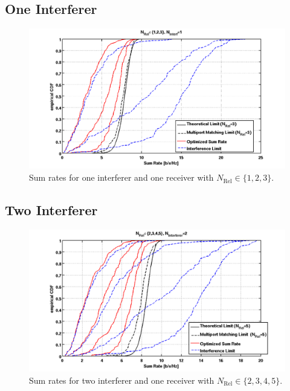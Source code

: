 \subsection{One Interferer}
\label{sec:1interf}
\begin{figure}[h]
\centering
  \includegraphics[width=0.9\linewidth]{images/Relcomparison_1interferer.png}
\caption{Sum rates for one interferer and one receiver with  $N_\text{Rel}\in\{1,2,3\}$.}
\label{fig:relcomp_1}
\end{figure}

\subsection{Two Interferer}
\label{sec:2interf}
\begin{figure}[h]
\centering
  \includegraphics[width=0.9\linewidth]{images/Relcomparison_2interferer.png}
\caption{Sum rates for two interferer and one receiver with  $N_\text{Rel}\in\{2,3,4,5\}$.}
\label{fig:relcomp_2}
\end{figure}

